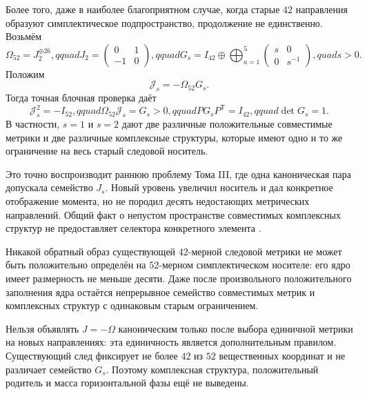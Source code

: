 Более того, даже в наиболее благоприятном случае, когда старые $42$
направления образуют симплектическое подпространство, продолжение не
единственно. Возьмём
\begin{equation}
 \Omega_{52}=J_2^{\oplus26},qquad
 J_2=\begin{pmatrix}0&1\\-1&0\end{pmatrix},qquad
 G_s=I_{42}\oplus
 \bigoplus_{a=1}^{5}\begin{pmatrix}s&0\\0&s^{-1}\end{pmatrix},quad s>0.
 \label{eq:v8-cotangent-compatible-metric-family}
\end{equation}
Положим
\begin{equation}
 \mathcal J_s=-\Omega_{52}G_s.
 \label{eq:v8-cotangent-compatible-J-family}
\end{equation}
Тогда точная блочная проверка даёт
\begin{equation}
 \mathcal J_s^2=-I_{52},qquad
 \Omega_{52}\mathcal J_s=G_s>0,qquad
 P G_sP^{\mathsf T}=I_{42},qquad \det G_s=1.
 \label{eq:v8-cotangent-compatible-family-identities}
\end{equation}
В частности, $s=1$ и $s=2$ дают две различные положительные совместимые
метрики и две различные комплексные структуры, которые имеют одно и то же
ограничение на весь старый следовой носитель.

Это точно воспроизводит раннюю проблему Тома III, где одна каноническая
пара допускала семейство $J_s$. Новый уровень увеличил носитель и дал
конкретное отображение момента, но не породил десять недостающих
метрических направлений. Общий факт о непустом пространстве совместимых
комплексных структур не предоставляет селектора конкретного элемента
\cite{v8-compatible-metric-da-silva,v8-compatible-metric-guillemin}.

\begin{theorem}
Никакой обратный образ существующей $42$-мерной следовой метрики не может
быть положительно определён на $52$-мерном симплектическом носителе: его
ядро имеет размерность не меньше десяти. Даже после произвольного
положительного заполнения ядра остаётся непрерывное семейство совместимых
метрик и комплексных структур с одинаковым старым ограничением.
\end{theorem}

\begin{nogocriterion}
Нельзя объявлять $J=-\Omega$ каноническим только после выбора единичной
метрики на новых направлениях: эта единичность является дополнительным
правилом. Существующий след фиксирует не более $42$ из $52$ вещественных
координат и не различает семейство $G_s$. Поэтому комплексная структура,
положительный родитель и масса горизонтальной фазы ещё не выведены.
\end{nogocriterion}

